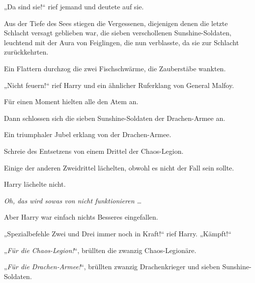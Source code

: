 „Da sind sie!“ rief jemand und deutete auf sie.

Aus der Tiefe des Sees stiegen die Vergessenen, diejenigen denen die letzte Schlacht versagt geblieben war, die sieben verschollenen Sunshine-Soldaten, leuchtend mit der Aura von Feiglingen, die nun verblasste, da sie zur Schlacht zurückkehrten.

Ein Flattern durchzog die zwei Fischschwärme, die Zauberstäbe wankten.

„Nicht feuern!“ rief Harry und ein ähnlicher Ruferklang von General Malfoy.

Für einen Moment hielten alle den Atem an.

Dann schlossen sich die sieben Sunshine-Soldaten der Drachen-Armee an.

Ein triumphaler Jubel erklang von der Drachen-Armee.

Schreie des Entsetzens von einem Drittel der Chaos-Legion.

Einige der anderen Zweidrittel lächelten, obwohl es nicht der Fall sein sollte.

Harry lächelte nicht.

\emph{Oh, das wird sowas von nicht funktionieren …}

Aber Harry war einfach nichts Besseres eingefallen.

„Spezialbefehle Zwei und Drei immer noch in Kraft!“ rief Harry.
„Kämpft!“

„\emph{Für die Chaos-Legion!}“, brüllten die zwanzig Chaos-Legionäre.

„\emph{Für die Drachen-Armee!}“, brüllten zwanzig Drachenkrieger und sieben Sunshine-Soldaten.

